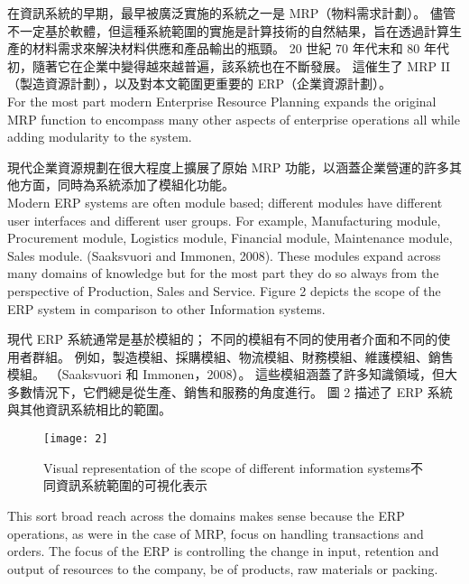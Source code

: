\fontsize{14pt}{5pt}\sectionef
 {在資訊系統的早期，最早被廣泛實施的系統之一是 MRP（物料需求計劃）。 儘管不一定基於軟體，但這種系統範圍的實施是計算技術的自然結果，旨在透過計算生產的材料需求來解決材料供應和產品輸出的瓶頸。 20 世紀 70 年代末和 80 年代初，隨著它在企業中變得越來越普遍，該系統也在不斷發展。 這催生了 MRP II（製造資源計劃），以及對本文範圍更重要的 ERP（企業資源計劃）。}\\[15pt]

\fontsize{14pt}{2.5pt}\sectionef 
{For the most part modern Enterprise Resource Planning expands the original MRP function to encompass many other aspects of enterprise operations all while adding modularity to the system. }

\fontsize{14pt}{5pt}\sectionef
 {現代企業資源規劃在很大程度上擴展了原始 MRP 功能，以涵蓋企業營運的許多其他方面，同時為系統添加了模組化功能。}\\[15pt]

\fontsize{14pt}{2.5pt}\sectionef 
{Modern ERP systems are often module based; different modules have different user interfaces and different user groups. For example, Manufacturing module, Procurement module, Logistics module, Financial module, Maintenance module, Sales module. (Saaksvuori and Immonen, 2008). These modules expand across many domains of knowledge but for the most part they do so always from the perspective of Production, Sales and Service. Figure 2 depicts the scope of the ERP system in comparison to other Information systems. }

\fontsize{14pt}{5pt}\sectionef
 {現代 ERP 系統通常是基於模組的； 不同的模組有不同的使用者介面和不同的使用者群組。 例如，製造模組、採購模組、物流模組、財務模組、維護模組、銷售模組。 （Saaksvuori 和 Immonen，2008）。 這些模組涵蓋了許多知識領域，但大多數情況下，它們總是從生產、銷售和服務的角度進行。 圖 2 描述了 ERP 系統與其他資訊系統相比的範圍。}\\[15pt]
\newpage
\begin{figure}[hbt!]
\begin{center}
\texttt{[image: 2]}
\caption{\large Visual representation of the scope of different information systems不同資訊系統範圍的可視化表示}\label{fig.2}
\end{center}
\end{figure}

\fontsize{14pt}{2.5pt}\sectionef 
{This sort broad reach across the domains makes sense because the ERP operations, as were in the case of MRP, focus on handling transactions and orders. The focus of the ERP is controlling the change in input, retention and output of resources to the company, be of products, raw materials or packing. }

